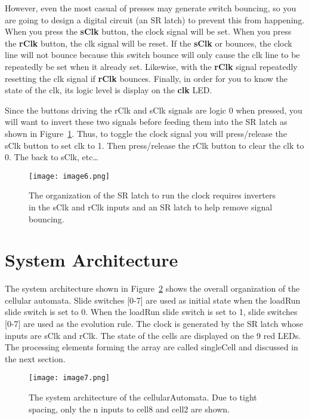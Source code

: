 However, even the most casual of presses may generate switch bouncing,
so you are going to design a digital circuit (an SR latch) to prevent
this from happening. When you press the \textbf{sClk} button, the clock
signal will be set. When you press the \textbf{rClk} button, the clk
signal will be reset. If the \textbf{sClk} or bounces, the clock line
will not bounce because this switch bounce will only cause the clk line
to be repeatedly be set when it already set. Likewise, with the
\textbf{rClk} signal repeatedly resetting the clk signal if
\textbf{rClk} bounces. Finally, in order for you to know the state of
the clk, its logic level is display on the \textbf{clk} LED.

Since the buttons driving the rClk and sClk signals are logic 0 when
pressed, you will want to invert these two signals before feeding them
into the SR latch as shown in Figure~\ref{fig:caSRlatchDebouce}. Thus, to 
toggle the clock signal
you will press/release the sClk button to set clk to 1. Then
press/release the rClk button to clear the clk to 0. The back to sClk,
etc\ldots{}

\begin{figure}
\texttt{[image: image6.png]}
\caption{ The organization of the SR latch to run the clock requires
inverters in the sClk and rClk inputs and an SR latch to help remove
signal bouncing.}
\label{fig:caSRlatchDebouce}
\end{figure}

\hypertarget{system-architecture}{%
\section{System Architecture}\label{system-architecture}}

The system architecture shown in Figure~\ref{fig:caSysArch} shows the overall organization
of the cellular automata. Slide switches {[}0-7{]} are used as initial
state when the loadRun slide switch is set to 0. When the loadRun slide
switch is set to 1, slide switches {[}0-7{]} are used as the evolution
rule. The clock is generated by the SR latch whose inputs are sClk and
rClk. The state of the cells are displayed on the 9 red LEDs. The
processing elements forming the array are called singleCell and
discussed in the next section.

\begin{figure}
\texttt{[image: image7.png]}
\caption{The system architecture of the cellularAutomata. Due to tight
spacing, only the n inputs to cell8 and cell2 are shown.}
\label{fig:caSysArch}
\end{figure}

